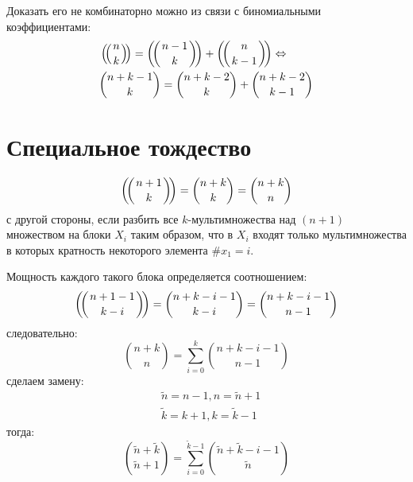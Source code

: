Доказать его не комбинаторно можно из связи с биномиальными коэффициентами:
\[
	\begin{split}
		& \left(\negmedspace\left({{n}\atop{k}}\right)\negmedspace\right) = \left(\negmedspace\left({{n-1}\atop{k}}\right)\negmedspace\right) + \left(\negmedspace\left({{n}\atop{k-1}}\right)\negmedspace\right) \Leftrightarrow \\
		& \binom{n+k-1}{k} = \binom{n+k-2}{k} + \binom{n+k-2}{k-1}
	\end{split}
\]

\section{Специальное тождество}
\[
	\left(\negmedspace\left({{n+1}\atop{k}}\right)\negmedspace\right) = \binom{n+k}{k} = \binom{n+k}{n}
\]
с другой стороны, если разбить все $k$-мультимножества над $\left(n+1\right)$ множеством на блоки $X_i$ таким образом, что в $X_i$ входят только мультимножества в которых кратность некоторого элемента $\#x_1 = i$.

Мощность каждого такого блока определяется соотношением:
\[
	\left(\negmedspace\left({{n+1-1}\atop{k-i}}\right)\negmedspace\right) = \binom{n+k-i-1}{k-i} = \binom{n+k-i-1}{n-1}
\]
следовательно:
\begin{equation}
	\binom{n+k}{n} = \sum_{i=0}^k\binom{n+k-i-1}{n-1}
\end{equation}
сделаем замену:
\[
	\begin{split}
		& \tilde n = n-1, n = \tilde n+1\\
		& \tilde k = k+1, k = \tilde k-1
	\end{split}
\]
тогда:
\begin{equation}
	\binom{\tilde n+\tilde k}{\tilde n+1} = \sum_{i=0}^{\tilde k - 1}\binom{\tilde n+\tilde k-i-1}{\tilde n}
\end{equation}
